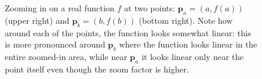 \begin{figure}
  \caption{Zooming in on a real function $f$ at two points: $\bm{p}_{a}=\left(a,f(a)\right)$ (upper right) and $\bm{p}_{b}=\left(b,f(b)\right)$ (bottom right). Note how around each of the points, the function looks somewhat linear: this is more pronounced around $\bm{p}_{b}$ where the function looks linear in the entire zoomed-in area, while near $\bm{p}_{a}$ it looks linear only near the point itself even though the zoom factor is higher.}
  \label{fig:zoom_in}
\end{figure}
